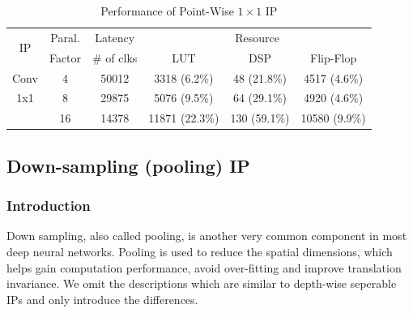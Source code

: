 \documentclass[a4paper, 11pt]{article}
\begin{document}
\begin{table}[]
\centering
\caption{Performance of Point-Wise $1 \times 1$ IP\vspace{-6pt}} \label{tab:conv_1x1}
\renewcommand{\arraystretch}{1.1}
\setlength{\tabcolsep}{4pt}
\begin{tabular}{|c | c | c | c c c| }
\hline 
 \multirow{2}{*}{IP} & Paral. & Latency & \multicolumn{3}{c|}{Resource} \\ \cline{4-6}
 	& Factor  & \# of clks & LUT & DSP & Flip-Flop  \\
 \hline \hline

 Conv    & 4 & 50012 &  3318 (6.2\%) & 48 (21.8\%) & 4517 (4.6\%) \\
  1x1    & 8 & 29875 &   5076 (9.5\%) & 64 (29.1\%) & 4920 (4.6\%) \\
	     & 16 & 14378 &  11871 (22.3\%) & 130 (59.1\%) & 10580 (9.9\%) \\ \hline
 
 \hline
\end{tabular}
\end{table}

\subsection{Down-sampling (pooling) IP}

\subsubsection{Introduction}

Down sampling, also called pooling, is another very common component in most deep neural networks. Pooling is used to reduce the spatial dimensions,
which helps gain computation performance, avoid over-fitting and improve translation invariance.
We omit the descriptions which are similar to depth-wise seperable IPs and only introduce the differences.
\end{document}
